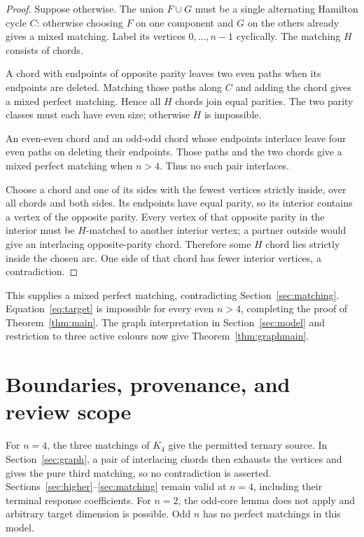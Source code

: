 \documentclass[11pt]{article}
\theoremstyle{definition}
\theoremstyle{plain}
\numberwithin{equation}{section}
\begin{document}
\begin{proof}
Suppose otherwise. The union \(F\cup G\) must be a single alternating
Hamilton cycle \(C\): otherwise choosing \(F\) on one component and \(G\)
on the others already gives a mixed matching. Label its vertices
\(0,\ldots,n-1\) cyclically. The matching \(H\) consists of chords.

A chord with endpoints of opposite parity leaves two even paths when its
endpoints are deleted. Matching those paths along \(C\) and adding the chord
gives a mixed perfect matching. Hence all \(H\) chords join equal parities.
The two parity classes must each have even size; otherwise \(H\) is impossible.

An even-even chord and an odd-odd chord whose endpoints interlace leave four
even paths on deleting their endpoints. Those paths and the two chords give
a mixed perfect matching when \(n>4\). Thus no such pair interlaces.

Choose a chord and one of its sides with the fewest vertices strictly inside,
over all chords and both sides. Its endpoints have equal parity, so its
interior contains a vertex of the opposite parity. Every vertex of that
opposite parity in the interior must be \(H\)-matched to another interior
vertex; a partner outside would give an interlacing opposite-parity chord.
Therefore some \(H\) chord lies strictly inside the chosen arc. One side of
that chord has fewer interior vertices, a contradiction.
\end{proof}

This supplies a mixed perfect matching, contradicting Section~\ref{sec:matching}.
Equation~\eqref{eq:target} is impossible for every even \(n>4\), completing
the proof of Theorem~\ref{thm:main}. The graph interpretation in
Section~\ref{sec:model} and restriction to three active colours now give
Theorem~\ref{thm:graphmain}.

\section{Boundaries, provenance, and review scope}\label{sec:scope}

For \(n=4\), the three matchings of \(K_4\) give the permitted ternary
source. In Section~\ref{sec:graph}, a pair of interlacing chords then exhausts
the vertices and gives the pure third matching, so no contradiction is asserted.
Sections~\ref{sec:higher}--\ref{sec:matching} remain valid at \(n=4\), including
their terminal response coefficients. For \(n=2\), the odd-core lemma does not
apply and arbitrary target dimension is possible. Odd \(n\) has no perfect
matchings in this model.
\end{document}
